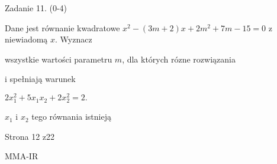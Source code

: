 \documentclass[a4paper,12pt]{article}
\begin{document}
Zadanie 11. (0-4)

Dane jest równanie kwadratowe $x^{2}-(3m+2)x+2m^{2}+7m-15=0$ z niewiadomą $x$. Wyznacz

wszystkie wartości parametru $m$, dla których rózne rozwiązania

i spełniają warunek

$2x_{1}^{2}+5x_{1}x_{2}+2x_{2}^{2}=2.$

$x_{1}$ i $x_{2}$ tego równania istnieją

Strona 12 z22

MMA-IR
\end{document}

